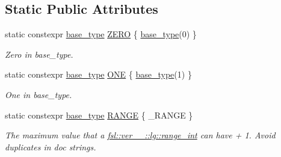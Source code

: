 \subsection*{Static Public Attributes}
\begin{DoxyCompactItemize}
\item 
\mbox{\label{structfsl_1_1ver__1__0_1_1lg_1_1range__int_1_1base__type__constants_ada13cd01546095bb61095888cd0ab41d}} 
static constexpr \mbox{\hyperlink{classfsl_1_1ver__1__0_1_1lg_1_1range__int_aa6c763f6d72d18c8b9129c0c06628cd3}{base\+\_\+type}} \mbox{\hyperlink{structfsl_1_1ver__1__0_1_1lg_1_1range__int_1_1base__type__constants_ada13cd01546095bb61095888cd0ab41d}{Z\+E\+RO}} \{ \mbox{\hyperlink{classfsl_1_1ver__1__0_1_1lg_1_1range__int_aa6c763f6d72d18c8b9129c0c06628cd3}{base\+\_\+type}}(0) \}
\begin{DoxyCompactList}\small\item\em Zero in base\+\_\+type. \end{DoxyCompactList}\item 
\mbox{\label{structfsl_1_1ver__1__0_1_1lg_1_1range__int_1_1base__type__constants_ac81a9d3f759017c4a50538cdcf22cc83}} 
static constexpr \mbox{\hyperlink{classfsl_1_1ver__1__0_1_1lg_1_1range__int_aa6c763f6d72d18c8b9129c0c06628cd3}{base\+\_\+type}} \mbox{\hyperlink{structfsl_1_1ver__1__0_1_1lg_1_1range__int_1_1base__type__constants_ac81a9d3f759017c4a50538cdcf22cc83}{O\+NE}} \{ \mbox{\hyperlink{classfsl_1_1ver__1__0_1_1lg_1_1range__int_aa6c763f6d72d18c8b9129c0c06628cd3}{base\+\_\+type}}(1) \}
\begin{DoxyCompactList}\small\item\em One in base\+\_\+type. \end{DoxyCompactList}\item 
static constexpr \mbox{\hyperlink{classfsl_1_1ver__1__0_1_1lg_1_1range__int_aa6c763f6d72d18c8b9129c0c06628cd3}{base\+\_\+type}} \mbox{\hyperlink{structfsl_1_1ver__1__0_1_1lg_1_1range__int_1_1base__type__constants_a5c247685a68e305498d076ae34c096e0}{R\+A\+N\+GE}} \{ \+\_\+\+R\+A\+N\+GE \}
\begin{DoxyCompactList}\small\item\em The maximum value that a \mbox{\hyperlink{classfsl_1_1ver__1__0_1_1lg_1_1range__int}{fsl\+::ver\+\_\+\_\+::lg\+::range\+\_\+int}} can have + 1. Avoid duplicates in doc strings. \end{DoxyCompactList}\item 

\end{DoxyCompactItemize}

